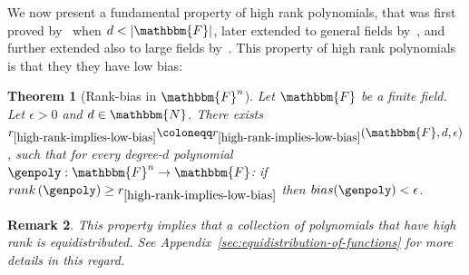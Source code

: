 \documentclass[10pt,a4paper]{article}
\newtheorem{theorem}{Theorem}[section]
\newtheorem{remark}[theorem]{Remark}
\newcommand{\definedas}[0]{\coloneqq}
\newcommand{\parens}[1]{\left( #1 \right)}
\newcommand{\sparens}[1]{\left[ #1 \right]}
\newcommand{\basefield}[0]{\mathbbm{F}}
\newcommand{\blocklength}[0]{n}
\newcommand{\field}[0]{\basefield^{\blocklength}}
\newcommand{\degree}[0]{d}
\newcommand{\charfunc}[1]{e \sparens{#1}}
\newcommand{\funcdef}[3]{#1:#2\rightarrow#3}
\newcommand{\naturalnumbersset}[0]{\mathbbm{N}}
\newcommand{\rank}[1]{rank \parens{#1}}
\newcommand{\bias}[1]{bias({#1})}
\newcommand{\norm}[1]{\left\lVert{#1}\right\rVert}
\newcommand{\abs}[1]{\left| #1 \right|}
\newcommand{\gowersnorm}[2]{{\norm{#2}}_{U^{#1}}}
\begin{document}
We now present a fundamental property of high rank polynomials, that was first proved by~\cite{green2007distribution} when $\degree < \abs{\basefield}$,
later extended to general fields by~\cite{kaufman2008worst}, and further extended also to large fields by~\cite{DBLP:journals/corr/0001L15}.
This property of high rank polynomials is that they they have low bias:
\begin{theorem}[Rank-bias in $\field$]\label{high-rank-implies-low-bias}
    Let $\basefield$ be a finite field.
    Let $\epsilon > 0$ and $\degree \in \naturalnumbersset$.
    There exists $r_{\ref{high-rank-implies-low-bias}} \definedas r_{\ref{high-rank-implies-low-bias}}(\basefield, \degree, \epsilon)$,
    such that for every degree-$\degree$ polynomial $\funcdef{\genpoly}{\field}{\basefield}$:
    if $\rank{\genpoly} \geq r_{\ref{high-rank-implies-low-bias}}$ then $\bias{\genpoly} < \epsilon$.
\end{theorem}
\begin{remark}
    This property implies that a collection of polynomials that have high rank is \emph{equidistributed}.
    See Appendix~\ref{sec:equidistribution-of-functions} for more details in this regard.
\end{remark}

%
%
%
\end{document}
